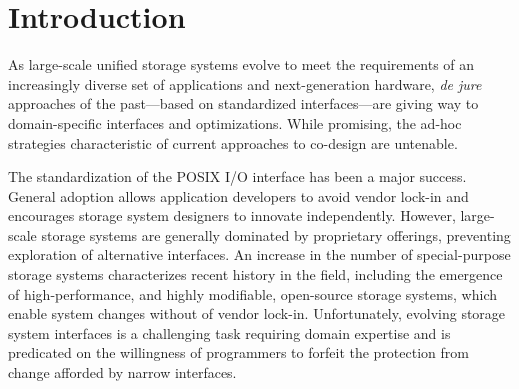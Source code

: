 \section{Introduction}
\label{sec:intro}

As large-scale unified storage systems evolve to meet the requirements 
of an increasingly diverse set of applications and next-generation hardware, \emph{de jure}
approaches of the past---based on standardized interfaces---are giving way to
domain-specific interfaces and optimizations. While promising, the ad-hoc strategies characteristic of 
current approaches to co-design are untenable.

The standardization of the POSIX I/O interface has been a major success. General adoption
allows application developers to avoid vendor lock-in and encourages storage system
designers to innovate independently. However, large-scale storage systems are generally dominated 
by proprietary offerings, preventing exploration of alternative
interfaces. An increase in the number of special-purpose storage systems characterizes recent history
in the field, including the emergence of high-performance, and highly modifiable, open-source storage systems, 
which enable system changes without of vendor lock-in. Unfortunately, evolving storage system
interfaces is a challenging task requiring domain expertise and is predicated on the willingness of
programmers to forfeit the protection from change afforded by narrow
interfaces.

